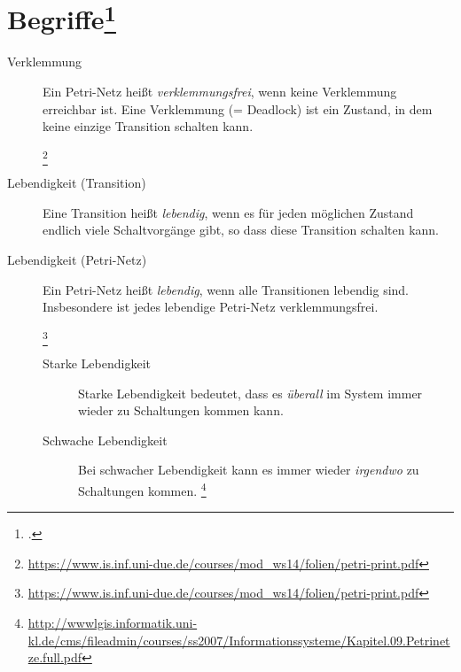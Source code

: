 \documentclass{lehramt-informatik-haupt}
\begin{document}
\section{Begriffe\footcite[Seite 10]{sosy:fs:3}}

\begin{description}
\item[Verklemmung]
Ein Petri-Netz heißt \emph{verklemmungsfrei}, wenn keine Verklemmung
erreichbar ist. Eine Verklemmung (= Deadlock) ist ein Zustand, in dem
keine einzige Transition schalten kann.

\begin{multicols}{2}

\footnote{\url{https://www.is.inf.uni-due.de/courses/mod_ws14/folien/petri-print.pdf}}
\end{multicols}

\item[Lebendigkeit (Transition)]
Eine Transition heißt \emph{lebendig}, wenn es für jeden möglichen
Zustand endlich viele Schaltvorgänge gibt, so dass diese Transition
schalten kann.

\item[Lebendigkeit (Petri-Netz)]
Ein Petri-Netz heißt \emph{lebendig}, wenn alle Transitionen lebendig
sind. Insbesondere ist jedes lebendige Petri-Netz verklemmungsfrei.

\footnote{\url{https://www.is.inf.uni-due.de/courses/mod_ws14/folien/petri-print.pdf}}

\begin{description}
\item[Starke Lebendigkeit]
Starke Lebendigkeit bedeutet, dass es \emph{überall} im System immer
wieder zu Schaltungen kommen kann.

\item[Schwache Lebendigkeit]
Bei schwacher Lebendigkeit kann es immer wieder \emph{irgendwo} zu
Schaltungen kommen.
\footnote{\url{http://wwwlgis.informatik.uni-kl.de/cms/fileadmin/courses/ss2007/Informationssysteme/Kapitel.09.Petrinetze.full.pdf}}


\end{description}
\end{description}
\end{document}
